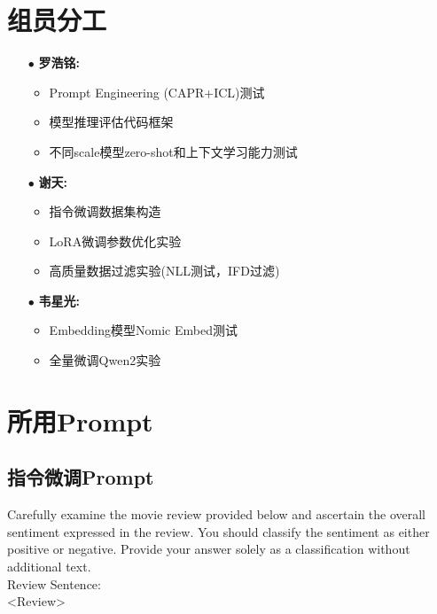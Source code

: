 \documentclass{article}
\begin{document}
\section{组员分工}
\begin{itemize}
  \item[$\bullet$] \textbf{罗浩铭: }
    \begin{itemize}
      \item Prompt Engineering (CAPR+ICL)测试
      \item 模型推理评估代码框架
      \item 不同scale模型zero-shot和上下文学习能力测试
    \end{itemize}
  \item[$\bullet$] \textbf{谢天: }
    \begin{itemize}
      \item 指令微调数据集构造
      \item LoRA微调参数优化实验
      \item 高质量数据过滤实验(NLL测试，IFD过滤)
    \end{itemize}
  \item[$\bullet$] \textbf{韦星光: }
    \begin{itemize}
      \item Embedding模型Nomic Embed测试
      \item 全量微调Qwen2实验
    \end{itemize}
\end{itemize}

\newpage


\newpage
\appendix

\section{所用Prompt}
\subsection{指令微调Prompt}
Carefully examine the movie review provided below and ascertain the overall sentiment expressed in the review. You should classify the sentiment as either positive or negative. Provide your answer solely as a classification without additional text. \\
Review Sentence:\\
<Review>\\
\end{document}
